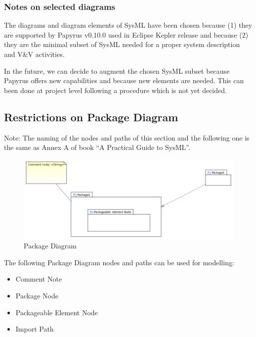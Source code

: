 \subsubsection{Notes on selected diagrams}

The diagrams and diagram elements of SysML have been chosen because
(1) they are supported by Papyrus v0.10.0 used in Eclipse Kepler
release and because (2) they are the minimal subset of SysML needed
for a proper system description and V\&V activities.

In the future, we can decide to augment the chosen SysML subset
because Papyrus offers new capabilities and because new elements are
needed. This can been done at project level following a procedure
which is not yet decided.

\subsection{Restrictions on Package Diagram}

Note: The naming of the nodes and paths of this section and the
following one is the same as Annex A of book ``A Practical Guide to
SysML''.


\begin{figure}[ht]
  \centering
  \includegraphics[width=\textwidth]{images/PackageDiagram.PNG}
  \caption{Package Diagram}
  \label{fig:package diagram}
\end{figure}


The following Package Diagram nodes and paths can be used for
modelling:
\begin{itemize}
\item Comment Note 
\item Package Node 
\item Packageable Element Node
\item Import Path 
\end{itemize}


